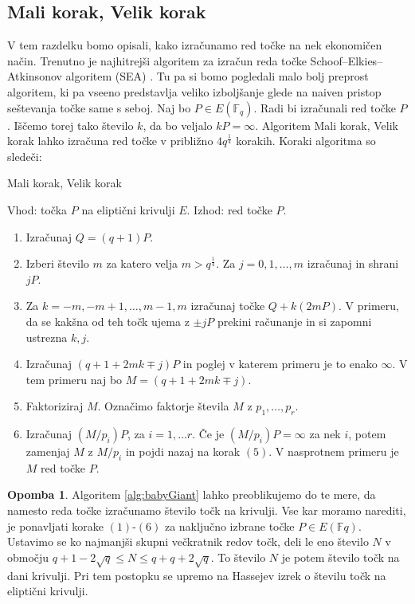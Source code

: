 \documentclass[12pt,a4paper,twoside]{article}
\theoremstyle{definition} %
\newtheorem{opomba}[definicija]{Opomba}
\theoremstyle{plain} %
\numberwithin{equation}{section}  %
\newcommand{\F}{\mathbb F}
\begin{document}
\subsection{Mali korak, Velik korak}
V tem razdelku bomo opisali, kako izračunamo red točke na nek ekonomičen način. Trenutno je najhitrejši algoritem za izračun reda točke Schoof–Elkies–Atkinsonov algoritem (SEA) \cite{Schoof1995}. Tu pa si bomo pogledali malo bolj preprost algoritem, ki pa vseeno predstavlja veliko izboljšanje glede na naiven pristop seštevanja točke same s seboj.
Naj bo $P \in E(\F_q)$. Radi bi izračunali red točke $P$. Iščemo torej tako število $k$, da bo veljalo $kP = \infty$. Algoritem Mali korak, Velik korak lahko izračuna red točke v približno $4q^{\frac{1}{4}}$ korakih. Koraki algoritma so sledeči:

\begin{algorithm}[H]
\caption[MV]{Mali korak, Velik korak}
\label{alg:babyGiant}
Vhod: točka $P$ na eliptični krivulji $E$.\newline
Izhod: red točke $P$. \newline
\begin{enumerate}
\item Izračunaj $Q = (q+1)P$.
\item Izberi število $m$ za katero velja $m >q^{\frac{1}{4}}$. Za $j = 0,1,\ldots,m$ izračunaj in shrani $jP$.
\item Za $k = -m,-m+1,\ldots,m-1,m$ izračunaj točke $Q +k(2mP)$. V primeru, da se kakšna od teh točk ujema z $\pm jP$ prekini računanje in si zapomni ustrezna $k,j$.
\item Izračunaj $(q+1+2mk \mp j)P$ in poglej v katerem primeru je to enako $\infty$. V tem primeru naj bo $M = (q+1+2mk \mp j)$.
\item Faktoriziraj $M$. Označimo faktorje števila $M$ z $p_1,\ldots,p_r$.
\item Izračunaj $(M/p_i)P$, za $i=1,\ldots r$. Če je $(M/p_i)P = \infty$ za nek $i$, potem zamenjaj $M$ z $M/p_i$ in pojdi nazaj na korak $(5)$. V nasprotnem primeru je $M$ red točke $P$.
\end{enumerate}

\end{algorithm}

\begin{opomba}
\label{opo:MaliVeliki}
Algoritem \ref{alg:babyGiant} lahko preoblikujemo do te mere, da namesto reda točke izračunamo število točk na krivulji. Vse kar moramo narediti, je ponavljati korake $(1)$-$(6)$ za naključno izbrane točke $P \in E(\F{q})$. Ustavimo se ko najmanjši skupni večkratnik redov točk, deli le eno število $N$ v območju $q+1-2\sqrt{q} \leq N \leq q+q+2\sqrt{q}$. To število $N$ je potem število točk na dani krivulji. Pri tem postopku se upremo na Hassejev izrek o številu točk na eliptični krivulji.

\end{opomba}
\end{document}
